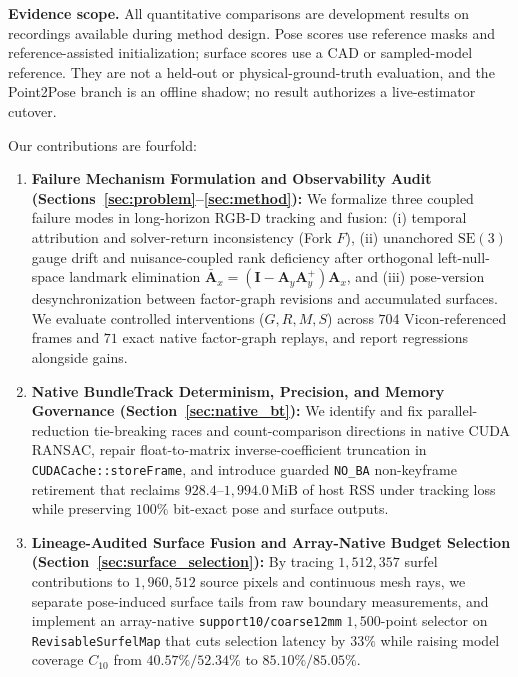 \documentclass[10pt,journal]{IEEEtran}
\begin{document}
\textbf{Evidence scope.} All quantitative comparisons are development results on recordings available during method design. Pose scores use reference masks and reference-assisted initialization; surface scores use a CAD or sampled-model reference. They are not a held-out or physical-ground-truth evaluation, and the Point2Pose branch is an offline shadow; no result authorizes a live-estimator cutover.

Our contributions are fourfold:
\begin{enumerate}
    \item \textbf{Failure Mechanism Formulation and Observability Audit (Sections~\ref{sec:problem}--\ref{sec:method}):} We formalize three coupled failure modes in long-horizon RGB-D tracking and fusion: (i) temporal attribution and solver-return inconsistency (Fork $F$), (ii) unanchored $\mathrm{SE}(3)$ gauge drift and nuisance-coupled rank deficiency after orthogonal left-null-space landmark elimination $\bar{\mathbf{A}}_x=(\mathbf{I}-\mathbf{A}_y\mathbf{A}_y^+)\mathbf{A}_x$, and (iii) pose-version desynchronization between factor-graph revisions and accumulated surfaces. We evaluate controlled interventions ($G,R,M,S$) across $704$ Vicon-referenced frames and $71$ exact native factor-graph replays, and report regressions alongside gains.
    \item \textbf{Native BundleTrack Determinism, Precision, and Memory Governance (Section~\ref{sec:native_bt}):} We identify and fix parallel-reduction tie-breaking races and count-comparison directions in native CUDA RANSAC, repair float-to-matrix inverse-coefficient truncation in \texttt{CUDACache::storeFrame}, and introduce guarded \texttt{NO\_BA} non-keyframe retirement that reclaims $928.4$--$1{,}994.0\,\mathrm{MiB}$ of host RSS under tracking loss while preserving $100\%$ bit-exact pose and surface outputs.
    \item \textbf{Lineage-Audited Surface Fusion and Array-Native Budget Selection (Section~\ref{sec:surface_selection}):} By tracing $1{,}512{,}357$ surfel contributions to $1{,}960{,}512$ source pixels and continuous mesh rays, we separate pose-induced surface tails from raw boundary measurements, and implement an array-native \texttt{support10/coarse12mm} $1{,}500$-point selector on \texttt{RevisableSurfelMap} that cuts selection latency by $33\%$ while raising model coverage $C_{10}$ from $40.57\%/52.34\%$ to $85.10\%/85.05\%$.

\end{enumerate}
\end{document}
